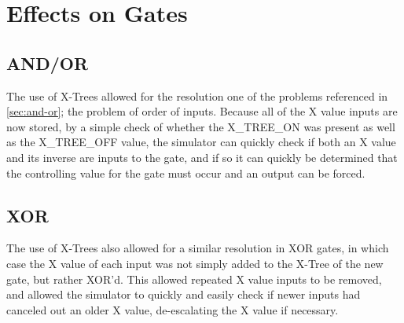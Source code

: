 \documentclass[12pt]{report}
\begin{document}
\begin{figure}[h]
	\centering
\end{figure}

\section{Effects on Gates}\label{sec:xtree-effects}

\subsection{AND/OR}
The use of X-Trees allowed for the resolution one of the problems referenced in \cref{sec:and-or}; the problem of order of inputs. Because all of the X value inputs are now stored, by a simple check of whether the X\_TREE\_ON was present as well as the X\_TREE\_OFF value, the simulator can quickly check if both an X value and its inverse are inputs to the gate, and if so it can quickly be determined that the controlling value for the gate must occur and an output can be forced.

\subsection{XOR}
The use of X-Trees also allowed for a similar resolution in XOR gates, in which case the X value of each input was not simply added to the X-Tree of the new gate, but rather XOR'd. This allowed repeated X value inputs to be removed, and allowed the simulator to quickly and easily check if newer inputs had canceled out an older X value, de-escalating the X value if necessary.
\end{document}

